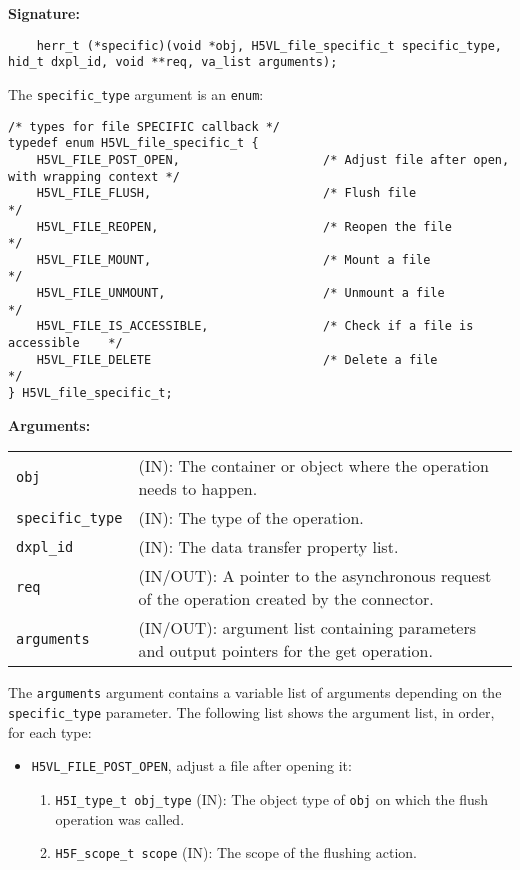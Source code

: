 \begin{mdframed}[style=bgbox] 
\textbf{Signature:}
\begin{lstlisting}
    herr_t (*specific)(void *obj, H5VL_file_specific_t specific_type, hid_t dxpl_id, void **req, va_list arguments);
\end{lstlisting}

The \texttt{specific\_type} argument is an \texttt{enum}:
\begin{lstlisting}
/* types for file SPECIFIC callback */
typedef enum H5VL_file_specific_t {                                              
    H5VL_FILE_POST_OPEN,                    /* Adjust file after open, with wrapping context */
    H5VL_FILE_FLUSH,                        /* Flush file                       */
    H5VL_FILE_REOPEN,                       /* Reopen the file                  */
    H5VL_FILE_MOUNT,                        /* Mount a file                     */
    H5VL_FILE_UNMOUNT,                      /* Unmount a file                   */
    H5VL_FILE_IS_ACCESSIBLE,                /* Check if a file is accessible    */
    H5VL_FILE_DELETE                        /* Delete a file                    */
} H5VL_file_specific_t;
\end{lstlisting}

\textbf{Arguments:}\\
\begin{tabular}{l p{13.5cm}}
  \texttt{obj} & (IN): The container or object where the operation needs
  to happen.\\
  \texttt{specific\_type} & (IN): The type of the operation.\\
  \texttt{dxpl\_id} & (IN): The data transfer property list.\\
  \texttt{req} & (IN/OUT): A pointer to the asynchronous request of the
  operation created by the connector.\\
  \texttt{arguments} & (IN/OUT): argument list containing parameters and
  output pointers for the get operation. \\
\end{tabular}

The \texttt{arguments} argument contains a variable list of arguments
depending on the \texttt{specific\_type} parameter. The following list shows
the argument list, in order, for each type:

\begin{itemize}
\item \texttt{H5VL\_FILE\_POST\_OPEN}, adjust a file after opening it:
  \begin{enumerate}
  \item \texttt{H5I\_type\_t obj\_type} (IN): The object type of \texttt{obj} on which the flush operation was called.
  \item \texttt{H5F\_scope\_t scope} (IN): The scope of the flushing action.
  \end{enumerate}
        

\end{itemize}
\end{mdframed}
